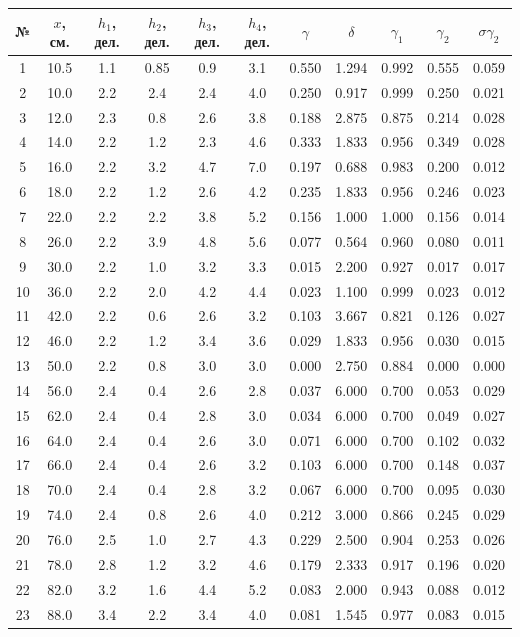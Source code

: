 \documentclass[a4paper, 12pt]{article}
\begin{document}
\begin{table}[h]
\centering
\begin{tabular}{|c|c|c|c|c|c|c|c|c|c|c|}
\hline 
    № &  $x$, см. & $h_1$, дел. & $h_2$, дел.  & $h_3$, дел. & $h_4$, дел. & $\gamma$ & $\delta$ & $\gamma_1$ & $\gamma_2$ & $\sigma \gamma_2$ \\ \hline
    1 & 10.5 & 1.1 & 0.85 & 0.9 & 3.1 & 0.550 & 1.294 & 0.992 & 0.555  & 0.059 \\ \hline
    2 & 10.0 & 2.2 & 2.4 & 2.4 & 4.0 & 0.250 & 0.917 & 0.999 & 0.250  & 0.021 \\ \hline
    3 & 12.0 & 2.3 & 0.8 & 2.6 & 3.8 & 0.188 & 2.875 & 0.875 & 0.214  & 0.028 \\ \hline
    4 & 14.0 & 2.2 & 1.2 & 2.3 & 4.6 & 0.333 & 1.833 & 0.956 & 0.349  & 0.028 \\ \hline
    5 & 16.0 & 2.2 & 3.2 & 4.7 & 7.0 & 0.197 & 0.688 & 0.983 & 0.200  & 0.012 \\ \hline
    6 & 18.0 & 2.2 & 1.2 & 2.6 & 4.2 & 0.235 & 1.833 & 0.956 & 0.246  & 0.023 \\ \hline
    7 & 22.0 & 2.2 & 2.2 & 3.8 & 5.2 & 0.156 & 1.000 & 1.000 & 0.156  & 0.014 \\ \hline
    8 & 26.0 & 2.2 & 3.9 & 4.8 & 5.6 & 0.077 & 0.564 & 0.960 & 0.080  & 0.011 \\ \hline
    9 & 30.0 & 2.2 & 1.0 & 3.2 & 3.3 & 0.015 & 2.200 & 0.927 & 0.017  & 0.017 \\ \hline
    10 & 36.0 & 2.2 & 2.0 & 4.2 & 4.4 & 0.023 & 1.100 & 0.999 & 0.023  & 0.012 \\ \hline
    11 & 42.0 & 2.2 & 0.6 & 2.6 & 3.2 & 0.103 & 3.667 & 0.821 & 0.126  & 0.027 \\ \hline
    12 & 46.0 & 2.2 & 1.2 & 3.4 & 3.6 & 0.029 & 1.833 & 0.956 & 0.030  & 0.015 \\ \hline
    13 & 50.0 & 2.2 & 0.8 & 3.0 & 3.0 & 0.000 & 2.750 & 0.884 & 0.000  & 0.000 \\ \hline
    14 & 56.0 & 2.4 & 0.4 & 2.6 & 2.8 & 0.037 & 6.000 & 0.700 & 0.053  & 0.029 \\ \hline
    15 & 62.0 & 2.4 & 0.4 & 2.8 & 3.0 & 0.034 & 6.000 & 0.700 & 0.049  & 0.027 \\ \hline
    16 & 64.0 & 2.4 & 0.4 & 2.6 & 3.0 & 0.071 & 6.000 & 0.700 & 0.102  & 0.032 \\ \hline
    17 & 66.0 & 2.4 & 0.4 & 2.6 & 3.2 & 0.103 & 6.000 & 0.700 & 0.148  & 0.037 \\ \hline
    18 & 70.0 & 2.4 & 0.4 & 2.8 & 3.2 & 0.067 & 6.000 & 0.700 & 0.095  & 0.030 \\ \hline
    19 & 74.0 & 2.4 & 0.8 & 2.6 & 4.0 & 0.212 & 3.000 & 0.866 & 0.245  & 0.029 \\ \hline
    20 & 76.0 & 2.5 & 1.0 & 2.7 & 4.3 & 0.229 & 2.500 & 0.904 & 0.253  & 0.026 \\ \hline
    21 & 78.0 & 2.8 & 1.2 & 3.2 & 4.6 & 0.179 & 2.333 & 0.917 & 0.196  & 0.020 \\ \hline
    22 & 82.0 & 3.2 & 1.6 & 4.4 & 5.2 & 0.083 & 2.000 & 0.943 & 0.088  & 0.012 \\ \hline
    23 & 88.0 & 3.4 & 2.2 & 3.4 & 4.0 & 0.081 & 1.545 & 0.977 & 0.083  & 0.015 \\ \hline
    

\end{tabular}
\end{table}
\end{document}
